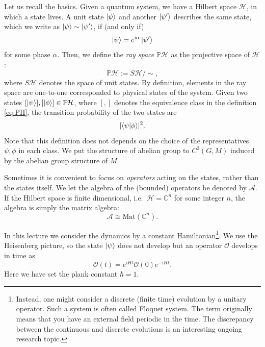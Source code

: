 \documentclass[
]{scrartcl}
\numberwithin{equation}{section}
\theoremstyle{definition}
\theoremstyle{definition}
\theoremstyle{definition}
\theoremstyle{definition}
\theoremstyle{remark}
\begin{document}
Let us recall the basics.
Given a quantum system, we have a Hilbert space \(\mathcal{H}\),
in which a state lives.
A unit state \(\ket{\psi}\) and another \(\ket{\psi'}\) describes the same state, which we write as \(\ket{\psi}\sim\ket{\psi'}\), if (and only if)
\begin{equation}
  \label{eq:phase-equiv}
  \ket{\psi} = e^{\mathrm{i}\alpha}\ket{\psi'}
\end{equation}
for some phase \(\alpha\).
Then, we define the \emph{ray space} \(\mathbb{P}\mathcal{H}\) as the projective space of \(\mathcal{H}\):
\begin{equation}
  \label{eq:PH}
  \mathbb{P}\mathcal{H} := S\mathcal{H}/\sim,
\end{equation}
where \(S\mathcal{H}\) denotes the space of unit states.
By definition, elements in the ray space are one-to-one corresponded to physical states of the system.
Given two states \([\ket{\psi}],[\ket{\phi}] \in \mathbb{P}\mathcal{H}\), where \([,]\) denotes the equivalence class in the definition \eqref{eq:PH}, the transition probability of the two states are
\begin{equation}
  \label{eq:transprob}
  \lvert \braket{\psi|\phi}\rvert^2.
\end{equation}
Note that this definition does not depends on the choice of the representatives \(\psi,\phi\) in each class.
We put the structure of abelian group to \(C^2(G,M)\) induced by the abelian group structure of \(M\).

Sometimes it is convenient to focus on \emph{operators} acting on the states, rather than the states itself.
We let the algebra of the (bounded) operators be denoted by \(\mathcal{A}\).
If the Hilbert space is finite dimensional, i.e.~\(\mathcal{H} = \mathbb{C}^n\) for some integer \(n\),
the algebra is simply the matrix algebra:
\begin{equation}
  \label{eq:Amatrix}
  \mathcal{A} \cong \mathrm{Mat}(\mathbb{C}^n).
\end{equation}

In this lecture we consider the dynamics by a constant Hamiltonian\footnote{Instead, one might consider a discrete (finite time) evolution by a unitary operator.
  Such a system is often called Floquet system. The term originally means that you have an external field periodic in the time. The discrepancy between the continuous and discrete evolutions is an interesting ongoing research topic.}.
We use the Heisenberg picture, so the state \(\ket{\psi}\) does not develop but an operator \(\mathcal{O}\)
develops in time as
\begin{equation}
  \label{eq:Odev}
  \mathcal{O}(t) = e^{\mathrm{i}H t} \mathcal{O}(0) e^{-\mathrm{i}H t}.
\end{equation}
Here we have set the plank constant \(\hbar =1\).
\end{document}
